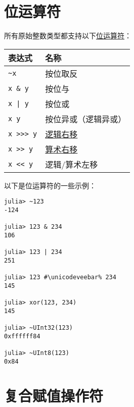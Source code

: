 \section{位运算符}



所有原始整数类型都支持以下\href{https://en.wikipedia.org/wiki/Bitwise\_operation\#Bitwise\_operators}{位运算符}：




\begin{table}[h]

\begin{tabulary}{\linewidth}{|L|L|}
\hline
表达式 & 名称 \\
\hline
\texttt{{\textasciitilde}x} & 按位取反 \\
\hline
\texttt{x \& y} & 按位与 \\
\hline
\texttt{x | y} & 按位或 \\
\hline
\texttt{x \unicodeveebar{} y} & 按位异或（逻辑异或） \\
\hline
\texttt{x >>> y} & \href{https://en.wikipedia.org/wiki/Logical\_shift}{逻辑右移} \\
\hline
\texttt{x >> y} & \href{https://en.wikipedia.org/wiki/Arithmetic\_shift}{算术右移} \\
\hline
\texttt{x << y} & 逻辑/算术左移 \\
\hline
\end{tabulary}

\end{table}



以下是位运算符的一些示例：




\begin{verbatim}
julia> ~123
-124

julia> 123 & 234
106

julia> 123 | 234
251

julia> 123 #\unicodeveebar% 234
145

julia> xor(123, 234)
145

julia> ~UInt32(123)
0xffffff84

julia> ~UInt8(123)
0x84
\end{verbatim}



\hypertarget{7921616576688360161}{}


\section{复合赋值操作符}



